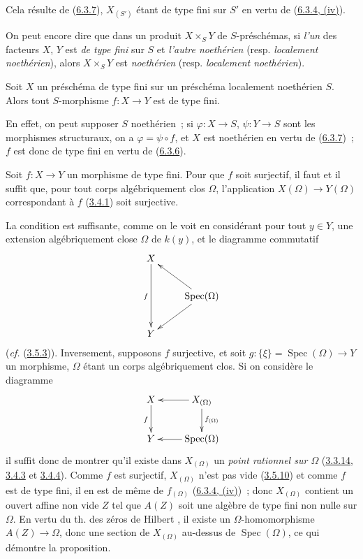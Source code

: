 Cela résulte de (\hyperref[I.6.3.7-fr]{6.3.7}), $X_{(S')}$ étant de type fini
sur $S'$ en vertu de (\hyperref[I.6.3.4-fr]{6.3.4, (iv)}).

On peut encore dire que dans un produit $X\times_S Y$ de $S$-préschémas, si
\emph{l'un} des
facteurs $X$, $Y$ est \emph{de type fini} sur $S$ et
\emph{l'autre noethérien} (resp. \emph{localement noethérien}), alors
$X\times_S Y$ est \emph{noethérien} (resp. \emph{localement noethérien}).

\begin{corollary}[6.3.9]
\label{I.6.3.9-fr}
Soit $X$ un préschéma de type fini sur un préschéma localement noethérien $S$.
Alors tout $S$-morphisme $f:X\to Y$ est de type fini.
\end{corollary}

En effet, on peut supposer $S$ noethérien~; si $\varphi:X\to S$,
$\psi:Y\to S$ sont les morphismes structuraux, on a $\varphi=\psi\circ f$, et
$X$ est noethérien en vertu de (\hyperref[I.6.3.7-fr]{6.3.7})~; $f$ est donc
de type fini en vertu de (\hyperref[I.6.3.6-fr]{6.3.6}).

\begin{proposition}[6.3.10]
\label{I.6.3.10-fr}
Soit $f:X\to Y$ un morphisme de type fini. Pour que $f$ soit surjectif, il faut
et il suffit que, pour tout corps algébriquement clos $\Omega$, l'application
$X(\Omega)\to Y(\Omega)$ correspondant à $f$
(\hyperref[I.3.4.1-fr]{3.4.1}) soit surjective.
\end{proposition}

La condition est suffisante, comme on le voit en considérant pour tout
$y\in Y$, une extension algébriquement close $\Omega$ de $k(y)$, et le
diagramme commutatif
\[
  \xymatrix{
    X\ar[dd]_f\\
    & \operatorname{Spec}(\Omega)\ar[ul]\ar[dl]\\
    Y
  }
\]
(\emph{cf.} (\hyperref[I.3.5.3-fr]{3.5.3})). Inversement, supposons $f$
surjective, et soit $g:\{\xi\}=\operatorname{Spec}(\Omega)\to Y$ un morphisme,
$\Omega$ étant un corps algébriquement clos. Si on considère le diagramme
\[
  \xymatrix{
    X\ar[d]_f &
    X_{(\Omega)}\ar[l]\ar[d]^{f_{(\Omega)}}\\
    Y &
    \operatorname{Spec}(\Omega)\ar[l]
  }
\]
il suffit donc de montrer qu'il existe dans $X_{(\Omega)}$ un
\emph{point rationnel sur $\Omega$}
(\hyperref[I.3.3.14-fr]{3.3.14}, \hyperref[I.3.4.3-fr]{3.4.3} et
\hyperref[I.3.4.4-fr]{3.4.4}). Comme $f$ est surjectif, $X_{(\Omega)}$ n'est
pas vide (\hyperref[I.3.5.10-fr]{3.5.10}) et comme $f$ est de type fini, il en
est de même de $f_{(\Omega)}$ (\hyperref[I.6.3.4-fr]{6.3.4, (iv)})~; donc
$X_{(\Omega)}$ contient un ouvert affine non vide $Z$ tel que $A(Z)$ soit une
algèbre de type fini non nulle sur $\Omega$. En vertu du th. des zéros de
Hilbert \cite{I-21}, il existe un $\Omega$-homomorphisme $A(Z)\to\Omega$, donc
une section de $X_{(\Omega)}$ au-dessus de $\operatorname{Spec}(\Omega)$, ce
qui démontre la proposition.

